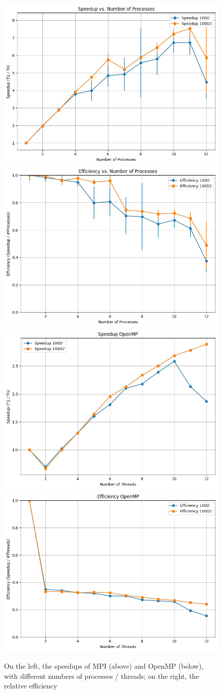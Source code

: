 \documentclass[11pt, journal]{IEEEtran}
\begin{document}
\begin{figure}
    \label{stats_mpi_omp}
    \centering
    \includegraphics[width = 0.49\linewidth]{imgs/mpi_speedup.jpeg}
    \includegraphics[width = 0.49\linewidth]{imgs/mpi_eff.jpeg}
    \\
    \includegraphics[width = 0.49\linewidth]{imgs/omp_speedup.jpeg}
    \includegraphics[width = 0.49\linewidth]{imgs/omp_eff.jpeg}
    \caption{On the left, the speedups of MPI (above) and OpenMP (below), with different numbers of processes / threads; on the right, the relative efficiency}
\end{figure}
\end{document}
